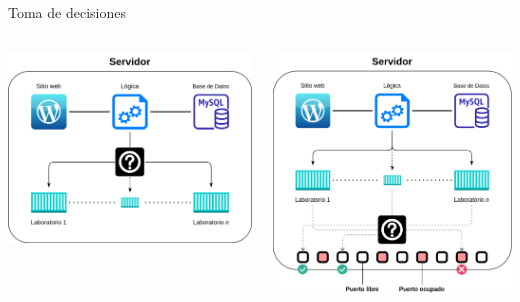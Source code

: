     \begin{frame}{Toma de decisiones}
        \begin{columns}[c]
                \includegraphics[scale=0.1]{images/diagramas/conexion.png}
            
                \includegraphics[scale=0.1]{images/diagramas/puertos.png}
        \end{columns}
    \end{frame}


